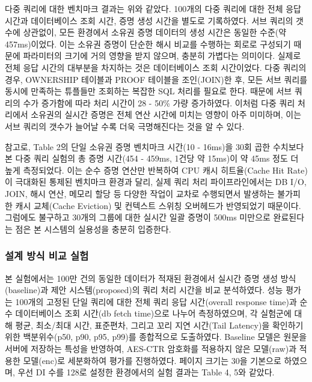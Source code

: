 다중 쿼리에 대한 벤치마크 결과는 위와 같았다. 100개의 다중 쿼리에 대한 전체 응답 시간과 데이터베이스 조회 시간, 증명 생성 시간을 별도로 기록하였다. 서브 쿼리의 갯수에 상관없이, 모든 환경에서 소유권 증명 데이터의 생성 시간은 동일한 수준(약 457ms)이었다. 이는 소유권 증명이 단순한 해시 비교를 수행하는 회로로 구성되기 때문에 파라미터의 크기에 거의 영향을 받지 않으며, 충분히 가볍다는 의미이다. 실제로 전체 응답 시간의 대부분을 차지하는 것은 데이터베이스 조회 시간이었다. 다중 쿼리의 경우, OWNERSHIP 테이블과 PROOF 테이블을 조인(JOIN)한 후, 모든 서브 쿼리를 동시에 만족하는 튜플들만 조회하는 복잡한 SQL 처리를 필요로 한다. 때문에 서브 쿼리의 수가 증가함에 따라 처리 시간이 28 - 50\% 가량 증가하였다. 이처럼 다중 쿼리 처리에서 소유권의 실시간 증명은 전체 연산 시간에 미치는 영향이 아주 미미하며, 이는 서브 쿼리의 갯수가 늘어날 수록 더욱 극명해진다는 것을 알 수 있다. 

\bigskip

참고로, Table 2의 단일 소유권 증명 벤치마크 시간(10 - 16ms)을 30회 곱한 수치보다 본 다중 쿼리 실험의 총 증명 시간(454 - 459ms, 1건당 약 15ms)이 약 45ms 정도 더 높게 측정되었다. 이는 순수 증명 연산만 반복하여 CPU 캐시 히트율(Cache Hit Rate)이 극대화된 통제된 벤치마크 환경과 달리, 실제 쿼리 처리 파이프라인에서는 DB I/O, JOIN, 해시 연산, 메모리 할당 등 다양한 작업이 교차로 수행되면서 발생하는 불가피한 캐시 교체(Cache Eviction) 및 컨텍스트 스위칭 오버헤드가 반영되었기 때문이다. 그럼에도 불구하고 30개의 그룹에 대한 실시간 일괄 증명이 500ms 미만으로 완료된다는 점은 본 시스템의 실용성을 충분히 입증한다.

\subsubsection{설계 방식 비교 실험}

본 실험에서는 100만 건의 동일한 데이터가 적재된 환경에서 실시간 증명 생성 방식(baseline)과 제안 시스템(proposed)의 쿼리 처리 시간을 비교 분석하였다. 성능 평가는 100개의 고정된 단일 쿼리에 대한 전체 쿼리 응답 시간(overall response time)과 순수 데이터베이스 조회 시간(db fetch time)으로 나누어 측정하였으며, 각 실험군에 대해 평균, 최소/최대 시간, 표준편차, 그리고 꼬리 지연 시간(Tail Latency)을 확인하기 위한 백분위수(p50, p90, p95, p99)를 종합적으로 도출하였다. Baseline 모델은 원문을 서버에 저장하는 특성을 반영하여, AES-CTR 암호화를 적용하지 않은 모델(raw)과 적용한 모델(enc)로 세분화하여 평가를 진행하였다. 페이지 크기는 30을 기본으로 하였으며, 우선 DI 수를 128로 설정한 환경에서의 실험 결과는 Table 4, 5와 같았다.

